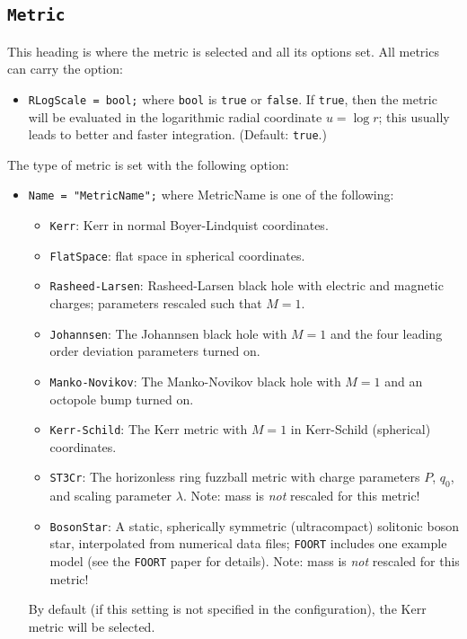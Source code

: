 \documentclass[11pt,a4paper]{article}
\newcommand{\code}[1]{{\tt #1}}
\begin{document}
\subsection{\code{Metric}}
This heading is where the metric is selected and all its options set. All metrics can carry the option:
\begin{itemize}
 \item \code{RLogScale = bool;}\newline
 where \code{bool} is \code{true} or \code{false}. If \code{true}, then the metric will be evaluated in the logarithmic radial coordinate $u = \log r$; this usually leads to better and faster integration. (Default: \code{true}.)
\end{itemize}
The type of metric is set with the following option:
\begin{itemize}
 \item \code{Name = "MetricName";}\newline
 where MetricName is one of the following:
 \begin{itemize}
 \item \code{Kerr}: Kerr in normal Boyer-Lindquist coordinates.
 \item \code{FlatSpace}: flat space in spherical coordinates.
 \item \code{Rasheed-Larsen}: Rasheed-Larsen black hole with electric and magnetic charges; parameters rescaled such that $M=1$.
 \item \code{Johannsen}: The Johannsen black hole with $M=1$ and the four leading order deviation parameters turned on.
 \item \code{Manko-Novikov}: The Manko-Novikov black hole with $M=1$ and an octopole bump turned on.
 \item \code{Kerr-Schild}: The Kerr metric with $M=1$ in Kerr-Schild (spherical) coordinates.
 \item \code{ST3Cr}: The horizonless ring fuzzball metric with charge parameters $P$, $q_0$, and scaling parameter $\lambda$. Note: mass is \emph{not} rescaled for this metric!
 \item \code{BosonStar}: A static, spherically symmetric (ultracompact) solitonic boson star, interpolated from numerical data files; \code{FOORT} includes one example model (see the \code{FOORT} paper for details). Note: mass is \emph{not} rescaled for this metric!
 \end{itemize}
 By default (if this setting is not specified in the configuration), the Kerr metric will be selected.
\end{itemize}
\end{document}
